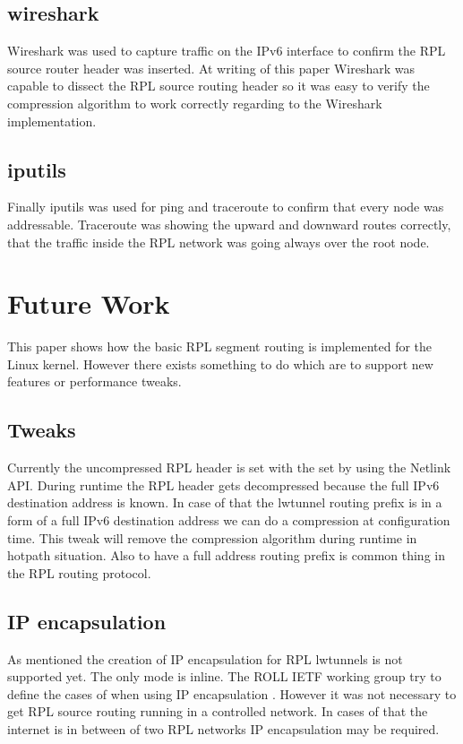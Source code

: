\documentclass[letterpaper]{article}
\begin{document}
\subsection{wireshark}

Wireshark \cite{wireshark} was used to capture traffic on the IPv6 interface to confirm the RPL source router header was inserted.
At writing of this paper Wireshark was capable to dissect the RPL source routing header so it was easy to verify the compression algorithm to work correctly regarding to the Wireshark implementation.

\subsection{iputils}

Finally iputils \cite{iputils} was used for ping and traceroute to confirm that every node was addressable.
Traceroute was showing the upward and downward routes correctly, that the traffic inside the RPL network was going always over the root node.

\section{Future Work}

This paper shows how the basic RPL segment routing is implemented for the Linux kernel.
However there exists something to do which are to support new features or performance tweaks.

\subsection{Tweaks}

Currently the uncompressed RPL header is set with the set by using the Netlink API.
During runtime the RPL header gets decompressed because the full IPv6 destination address is known.
In case of that the lwtunnel routing prefix is in a form of a full IPv6 destination address we can do a compression at configuration time.
This tweak will remove the compression algorithm during runtime in hotpath situation.
Also to have a full address routing prefix is common thing in the RPL routing protocol.

\subsection{IP encapsulation}

As mentioned the creation of IP encapsulation for RPL lwtunnels is not supported yet.
The only mode is inline. The ROLL IETF working group try to define the cases of when using IP encapsulation \cite{I-D.ietf-roll-useofrplinfo}.
However it was not necessary to get RPL source routing running in a controlled network.
In cases of that the internet is in between of two RPL networks IP encapsulation may be required.
\end{document}
